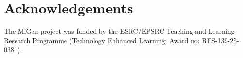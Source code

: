 \documentclass[authoryear,preprint,12pt]{elsarticle}
\begin{document}











\appendix



\section*{Acknowledgements} 

The MiGen project was funded by the ESRC/EPSRC Teaching and
Learning Research Programme (Technology Enhanced Learning; Award no:
RES-139-25-0381).




\end{document}
